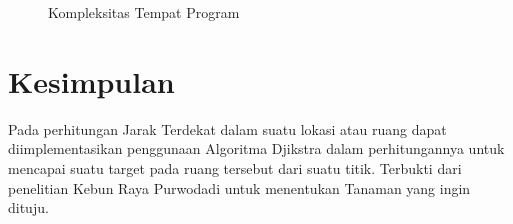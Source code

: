 \documentclass[conference]{IEEEtran}
\begin{document}
	\begin{figure}[htbp]
	\centering
	\scalebox{0.4}{}
	\caption{Kompleksitas Tempat Program}
	\end{figure}

	\section{Kesimpulan}
	Pada perhitungan Jarak Terdekat dalam suatu lokasi atau ruang dapat diimplementasikan penggunaan Algoritma Djikstra dalam perhitungannya untuk mencapai suatu target pada ruang tersebut dari suatu titik. Terbukti dari penelitian Kebun Raya Purwodadi untuk menentukan Tanaman yang ingin dituju.


	
	
	
\end{document}
